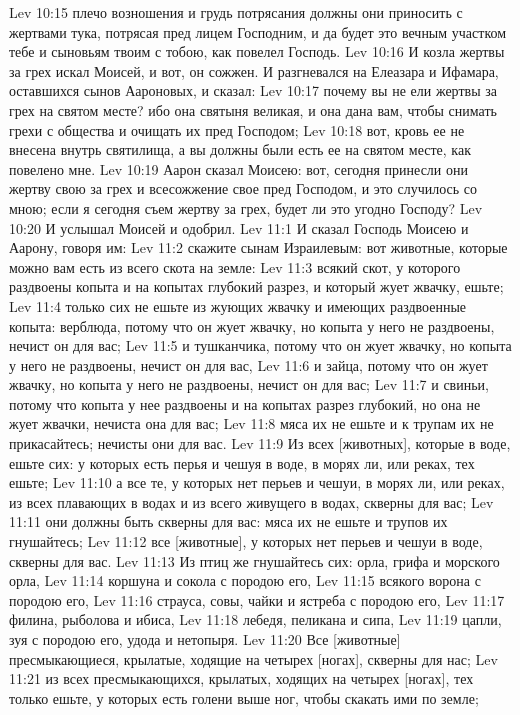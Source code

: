 Lev 10:15  плечо возношения и грудь потрясания должны они приносить с жертвами тука, потрясая пред лицем Господним, и да будет это вечным участком тебе и сыновьям твоим с тобою, как повелел Господь.
Lev 10:16  И козла жертвы за грех искал Моисей, и вот, он сожжен. И разгневался на Елеазара и Ифамара, оставшихся сынов Аароновых, и сказал:
Lev 10:17  почему вы не ели жертвы за грех на святом месте? ибо она святыня великая, и она дана вам, чтобы снимать грехи с общества и очищать их пред Господом;
Lev 10:18  вот, кровь ее не внесена внутрь святилища, а вы должны были есть ее на святом месте, как повелено мне.
Lev 10:19  Аарон сказал Моисею: вот, сегодня принесли они жертву свою за грех и всесожжение свое пред Господом, и это случилось со мною; если я сегодня съем жертву за грех, будет ли это угодно Господу?
Lev 10:20  И услышал Моисей и одобрил.
Lev 11:1  И сказал Господь Моисею и Аарону, говоря им:
Lev 11:2  скажите сынам Израилевым: вот животные, которые можно вам есть из всего скота на земле:
Lev 11:3  всякий скот, у которого раздвоены копыта и на копытах глубокий разрез, и который жует жвачку, ешьте;
Lev 11:4  только сих не ешьте из жующих жвачку и имеющих раздвоенные копыта: верблюда, потому что он жует жвачку, но копыта у него не раздвоены, нечист он для вас;
Lev 11:5  и тушканчика, потому что он жует жвачку, но копыта у него не раздвоены, нечист он для вас,
Lev 11:6  и зайца, потому что он жует жвачку, но копыта у него не раздвоены, нечист он для вас;
Lev 11:7  и свиньи, потому что копыта у нее раздвоены и на копытах разрез глубокий, но она не жует жвачки, нечиста она для вас;
Lev 11:8  мяса их не ешьте и к трупам их не прикасайтесь; нечисты они для вас.
Lev 11:9  Из всех [животных], которые в воде, ешьте сих: у которых есть перья и чешуя в воде, в морях ли, или реках, тех ешьте;
Lev 11:10  а все те, у которых нет перьев и чешуи, в морях ли, или реках, из всех плавающих в водах и из всего живущего в водах, скверны для вас;
Lev 11:11  они должны быть скверны для вас: мяса их не ешьте и трупов их гнушайтесь;
Lev 11:12  все [животные], у которых нет перьев и чешуи в воде, скверны для вас.
Lev 11:13  Из птиц же гнушайтесь сих: орла, грифа и морского орла,
Lev 11:14  коршуна и сокола с породою его,
Lev 11:15  всякого ворона с породою его,
Lev 11:16  страуса, совы, чайки и ястреба с породою его,
Lev 11:17  филина, рыболова и ибиса,
Lev 11:18  лебедя, пеликана и сипа,
Lev 11:19  цапли, зуя с породою его, удода и нетопыря.
Lev 11:20  Все [животные] пресмыкающиеся, крылатые, ходящие на четырех [ногах], скверны для нас;
Lev 11:21  из всех пресмыкающихся, крылатых, ходящих на четырех [ногах], тех только ешьте, у которых есть голени выше ног, чтобы скакать ими по земле;
